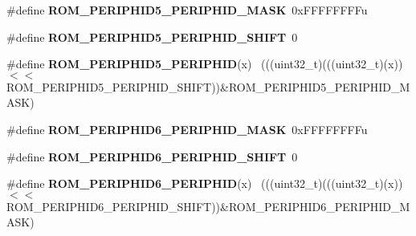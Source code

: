 \begin{DoxyCompactItemize}
\item 
\hypertarget{group___r_o_m___register___masks_ga39e8a3441c79c42651efba9100e653a7}{}\#define {\bfseries R\+O\+M\+\_\+\+P\+E\+R\+I\+P\+H\+I\+D5\+\_\+\+P\+E\+R\+I\+P\+H\+I\+D\+\_\+\+M\+A\+S\+K}~0x\+F\+F\+F\+F\+F\+F\+F\+Fu\label{group___r_o_m___register___masks_ga39e8a3441c79c42651efba9100e653a7}

\item 
\hypertarget{group___r_o_m___register___masks_ga083194b41cf1109fe5a6e235b2c1f89a}{}\#define {\bfseries R\+O\+M\+\_\+\+P\+E\+R\+I\+P\+H\+I\+D5\+\_\+\+P\+E\+R\+I\+P\+H\+I\+D\+\_\+\+S\+H\+I\+F\+T}~0\label{group___r_o_m___register___masks_ga083194b41cf1109fe5a6e235b2c1f89a}

\item 
\hypertarget{group___r_o_m___register___masks_ga5ed700cba7d4cd040b3c61174f897600}{}\#define {\bfseries R\+O\+M\+\_\+\+P\+E\+R\+I\+P\+H\+I\+D5\+\_\+\+P\+E\+R\+I\+P\+H\+I\+D}(x)                            ~(((uint32\+\_\+t)(((uint32\+\_\+t)(x))$<$$<$R\+O\+M\+\_\+\+P\+E\+R\+I\+P\+H\+I\+D5\+\_\+\+P\+E\+R\+I\+P\+H\+I\+D\+\_\+\+S\+H\+I\+F\+T))\&R\+O\+M\+\_\+\+P\+E\+R\+I\+P\+H\+I\+D5\+\_\+\+P\+E\+R\+I\+P\+H\+I\+D\+\_\+\+M\+A\+S\+K)\label{group___r_o_m___register___masks_ga5ed700cba7d4cd040b3c61174f897600}

\item 
\hypertarget{group___r_o_m___register___masks_gae29765428defa80237980d34b67f4fde}{}\#define {\bfseries R\+O\+M\+\_\+\+P\+E\+R\+I\+P\+H\+I\+D6\+\_\+\+P\+E\+R\+I\+P\+H\+I\+D\+\_\+\+M\+A\+S\+K}~0x\+F\+F\+F\+F\+F\+F\+F\+Fu\label{group___r_o_m___register___masks_gae29765428defa80237980d34b67f4fde}

\item 
\hypertarget{group___r_o_m___register___masks_ga0cb9b85e1ca798d1897bcef6afce8a79}{}\#define {\bfseries R\+O\+M\+\_\+\+P\+E\+R\+I\+P\+H\+I\+D6\+\_\+\+P\+E\+R\+I\+P\+H\+I\+D\+\_\+\+S\+H\+I\+F\+T}~0\label{group___r_o_m___register___masks_ga0cb9b85e1ca798d1897bcef6afce8a79}

\item 
\hypertarget{group___r_o_m___register___masks_ga61e6d41938290b1bc52272cb0c1b32a0}{}\#define {\bfseries R\+O\+M\+\_\+\+P\+E\+R\+I\+P\+H\+I\+D6\+\_\+\+P\+E\+R\+I\+P\+H\+I\+D}(x)                            ~(((uint32\+\_\+t)(((uint32\+\_\+t)(x))$<$$<$R\+O\+M\+\_\+\+P\+E\+R\+I\+P\+H\+I\+D6\+\_\+\+P\+E\+R\+I\+P\+H\+I\+D\+\_\+\+S\+H\+I\+F\+T))\&R\+O\+M\+\_\+\+P\+E\+R\+I\+P\+H\+I\+D6\+\_\+\+P\+E\+R\+I\+P\+H\+I\+D\+\_\+\+M\+A\+S\+K)\label{group___r_o_m___register___masks_ga61e6d41938290b1bc52272cb0c1b32a0}


\end{DoxyCompactItemize}
